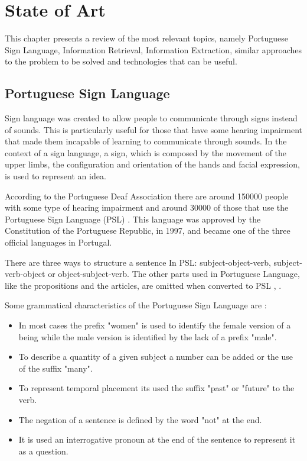 
\chapter{State of Art}
\label{chap:Chapter2}

This chapter presents a review of the most relevant topics, namely Portuguese Sign Language, Information Retrieval, Information Extraction, similar approaches to the problem to be solved and technologies that can be useful.

\section{Portuguese Sign Language}

Sign language was created to allow people to communicate through signs instead of sounds.
This is particularly useful for those that have some hearing impairment that made them incapable of learning to communicate through sounds.
In the context of a sign language, a sign, which is composed by the movement of the upper limbs, the configuration and orientation of the hands and facial expression, is used to represent an idea.

According to the Portuguese Deaf Association there are around 150000 people with some type of hearing impairment and around 30000 of those that use the Portuguese Sign Language (PSL) \autocite{gaspar_2015}.
This language was approved by the Constitution of the Portuguese Republic, in 1997, and became one of the three official languages in Portugal.

There are three ways to structure a sentence In PSL: subject-object-verb, subject-verb-object or object-subject-verb.
The other parts used in Portuguese Language, like the propositions and the articles, are omitted when converted to \gls{PSL} \autocite{bento_2013}, \autocite{martins_2011}.

Some grammatical characteristics of the Portuguese Sign Language are \autocite{bento_2013}:

\begin{itemize}
    \item In most cases the prefix "women" is used to identify the female version of a being while the male version is identified by the lack of a prefix "male".
    \item To describe a quantity of a given subject a number can be added or the use of the suffix "many".
    \item To represent temporal placement its used the suffix "past" or "future" to the verb.
    \item The negation of a sentence is defined by the word "not" at the end.
    \item It is used an interrogative pronoun at the end of the sentence to represent it as a question.
\end{itemize}

